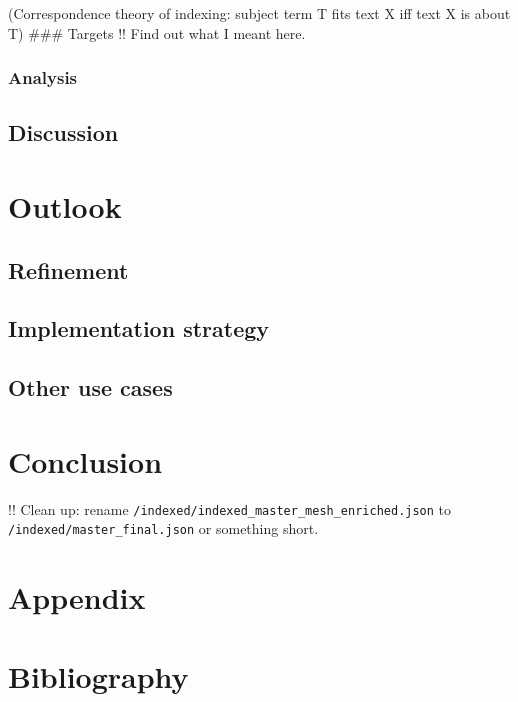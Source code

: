 (Correspondence theory of indexing: subject term T fits text X iff text
X is about T) \#\#\# Targets !! Find out what I meant here.

\hypertarget{analysis-2}{%
\subsubsection{Analysis}\label{analysis-2}}

\hypertarget{discussion-1}{%
\subsection{Discussion}\label{discussion-1}}

\hypertarget{outlook}{%
\section{Outlook}\label{outlook}}

\hypertarget{refinement}{%
\subsection{Refinement}\label{refinement}}

\hypertarget{implementation-strategy}{%
\subsection{Implementation strategy}\label{implementation-strategy}}

\hypertarget{other-use-cases}{%
\subsection{Other use cases}\label{other-use-cases}}

\hypertarget{conclusion}{%
\section{Conclusion}\label{conclusion}}

!! Clean up: rename
\texttt{/indexed/indexed\_master\_mesh\_enriched.json} to
\texttt{/indexed/master\_final.json} or something short.

\hypertarget{appendix}{%
\section{Appendix}\label{appendix}}

\hypertarget{bibliography}{%
\section{Bibliography}\label{bibliography}}

